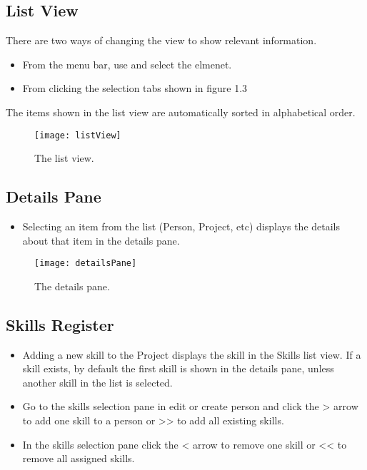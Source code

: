 \documentclass[11pt,fleqn]{book} %
\begin{document}
\pagebreak

\subsection{List View}
There are two ways of changing the view to show relevant information.
\begin{itemize}
  \item From the menu bar, use  and select the elmenet. 
  \item From clicking the selection tabs shown in figure 1.3
\end{itemize}
The items shown in the list view are automatically sorted in alphabetical order.

\begin{figure}[H]
  \centering
  \texttt{[image: listView]}
  \caption{The list view.\label{listView}}
\end{figure}

\subsection{Details Pane}
\begin{itemize}
  \item Selecting an item from the list (Person, Project, etc) displays the details about that item in the details pane.
\end{itemize}

\begin{figure}[H]
  \centering
  \texttt{[image: detailsPane]}
  \caption{The details pane.\label{detailsPane}}
\end{figure}

\pagebreak

\subsection{Skills Register}
\begin{itemize}
  \item Adding a new skill to the Project displays the skill in the Skills list view. If a skill exists, by default the first skill is shown in the details pane, unless another skill in the list is selected. 
  \item Go to the skills selection pane in edit or create person and click the > arrow to add one skill to a person or >> to add all existing skills.
  \item In the skills selection pane click the < arrow to remove one skill or << to remove all assigned skills. 
\end{itemize}
\end{document}
